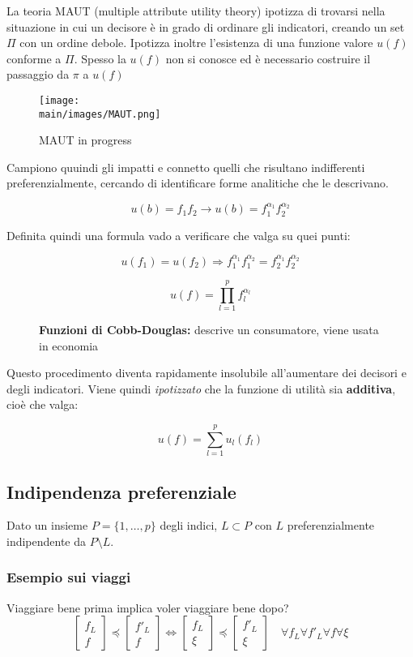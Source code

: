 \documentclass[\main/main.tex]{subfiles}
\begin{document}
La teoria MAUT (multiple attribute utility theory) ipotizza di trovarsi nella situazione in cui un decisore è in grado di ordinare gli indicatori, creando un set $\Pi$ con un ordine debole. Ipotizza inoltre l'esistenza di una funzione valore $u(f)$ conforme a $\Pi$. Spesso la $u(f)$ non si conosce ed è necessario costruire il passaggio da $\pi$ a $u(f)$

\begin{figure}[H]
  \centering
  \texttt{[image: \\main/images/MAUT.png]}
  \caption{MAUT in progress}
\end{figure}

Campiono quuindi gli impatti e connetto quelli che risultano indifferenti preferenzialmente, cercando di identificare forme analitiche che le descrivano.

\[
  u(b) = f_1f_2 \rightarrow u(b) = f_1^{\alpha_{1}}f_2^{\alpha_{2}}
\]

Definita quindi una formula vado a verificare che valga su quei punti:

\[
  u(f_1) = u(f_2) \Rightarrow  f_1^{\alpha_{1}}f_1^{\alpha_{2}} = f_2^{\alpha_{1}}f_2^{\alpha_{2}}
\]

\begin{figure}[H]
  \[
    u(f) = \prod_{l=1}^p f_l^{\alpha_l}
  \]
  \caption{\textbf{Funzioni di Cobb-Douglas:} descrive un consumatore, viene usata in economia}
\end{figure}

Questo procedimento diventa rapidamente insolubile all'aumentare dei decisori e degli indicatori. Viene quindi \textit{ipotizzato} che la funzione di utilità sia \textbf{additiva}, cioè che valga:

\[
  u(f) = \sum_{l=1}^p u_l(f_l)
\]

\subsection{Indipendenza preferenziale}
Dato un insieme $P = \{1, \dots, p\}$ degli indici, $L \subset P$ con $L$ preferenzialmente indipendente da $P \setminus L$.

\subsubsection{Esempio sui viaggi}
Viaggiare bene prima implica voler viaggiare bene dopo?
\[
  \begin{bmatrix}
    f_L \\
    f
  \end{bmatrix}
  \preceq
  \begin{bmatrix}
    f'_L \\
    f
  \end{bmatrix}
  \Leftrightarrow
  \begin{bmatrix}
    f_L \\
    \xi
  \end{bmatrix}
  \preceq
  \begin{bmatrix}
    f'_L \\
    \xi
  \end{bmatrix}
  \quad
  \forall f_L \forall f'_L \forall f \forall \xi
\]
\end{document}
